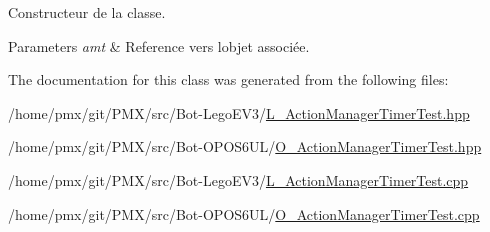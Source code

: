 Constructeur de la classe. 


\begin{DoxyParams}{Parameters}
{\em amt} & Reference vers l\textquotesingle{}objet associée. \\
\hline
\end{DoxyParams}


The documentation for this class was generated from the following files\+:\begin{DoxyCompactItemize}
\item 
/home/pmx/git/\+P\+M\+X/src/\+Bot-\/\+Lego\+E\+V3/\hyperlink{L__ActionManagerTimerTest_8hpp}{L\+\_\+\+Action\+Manager\+Timer\+Test.\+hpp}\item 
/home/pmx/git/\+P\+M\+X/src/\+Bot-\/\+O\+P\+O\+S6\+U\+L/\hyperlink{O__ActionManagerTimerTest_8hpp}{O\+\_\+\+Action\+Manager\+Timer\+Test.\+hpp}\item 
/home/pmx/git/\+P\+M\+X/src/\+Bot-\/\+Lego\+E\+V3/\hyperlink{L__ActionManagerTimerTest_8cpp}{L\+\_\+\+Action\+Manager\+Timer\+Test.\+cpp}\item 
/home/pmx/git/\+P\+M\+X/src/\+Bot-\/\+O\+P\+O\+S6\+U\+L/\hyperlink{O__ActionManagerTimerTest_8cpp}{O\+\_\+\+Action\+Manager\+Timer\+Test.\+cpp}\end{DoxyCompactItemize}
